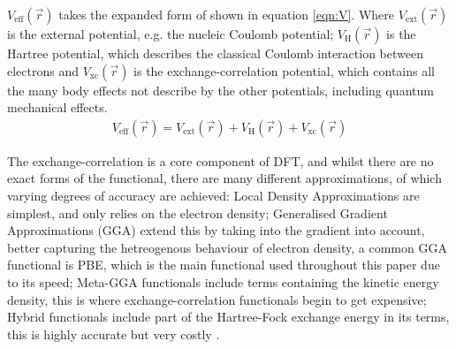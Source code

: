 \documentclass[10pt,a4paper,twocolumn,twoside]{extarticle}
\begin{document}
$V_\text{eff}(\vec{r})$ takes the expanded form of shown in equation \ref{eqn:V}. Where $V_\text{ext}(\vec{r})$ is the external potential, e.g. the nucleic Coulomb potential; $V_\text{H}(\vec{r})$ is the Hartree potential, which describes the classical Coulomb interaction between electrons and $V_\text{xc}(\vec{r})$ is the exchange-correlation potential, which contains all the many body effects not describe by the other potentials, including quantum mechanical effects.
\begin{align}
	V_\text{eff}(\vec{r}) = V_\text{ext}(\vec{r}) + V_\text{H}(\vec{r}) + V_\text{xc}(\vec{r})
	\label{eqn:V}
\end{align}



The exchange-correlation is a core component of DFT, and whilst there are no exact forms of the functional, there are many different approximations, of which varying degrees of accuracy are achieved: Local Density Approximations are simplest, and only relies on the electron density; Generalised Gradient Approximations (GGA) extend this by taking into the gradient into account, better capturing the hetreogenous behaviour of electron density, a common GGA functional is PBE\cite{PBE}, which is the main functional used throughout this paper due to its speed; Meta-GGA functionals include terms containing the kinetic energy density, this is where exchange-correlation functionals begin to get expensive; Hybrid functionals include part of the Hartree-Fock exchange energy in its terms, this is highly accurate but very costly \cite{HSE06}.  
\end{document}
